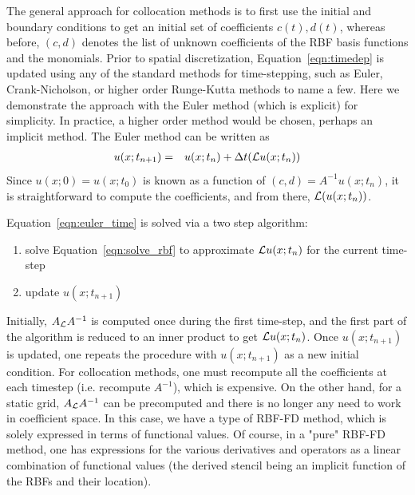 \documentclass{report}
\begin{document}
{The general approach for collocation methods is to first use the initial and boundary conditions to get an initial set of 
coefficients $c(t), d(t)$, whereas before, $(c,d)$ denotes the list of unknown coefficients of the RBF basis functions and the monomials. 
Prior to spatial discretization, Equation~\ref{eqn:timedep} is updated using any of the standard methods for time-stepping, such as Euler, Crank-Nicholson, or higher order Runge-Kutta methods to name a few. Here we demonstrate the approach with the Euler method (which is explicit) for simplicity. In practice, a higher order method would be chosen, perhaps an implicit method. 
The Euler method can be written as
\begin{eqnarray}
u(x; t_{n+1}) &=& u(x; t_{n}) + \Delta t (\diffop{u(x;t_n)}) %
 \label{eqn:euler_time}
\end{eqnarray}
Since $u(x;0)=u(x;t_0)$ is known as a function of $(c,d)=A^{-1} u(x;t_n)$, it is straightforward to compute the coefficients, and from there, $\mathcal{L}(u(x;t_n))$. 

Equation~\ref{eqn:euler_time} is solved via a two step algorithm: 
\begin{enumerate}
	\item solve Equation~\ref{eqn:solve_rbf} to approximate $\mathcal{L}u(x;t_n)$ for the current time-step
	\item update $u(x;t_{n+1})$
\end{enumerate}
Initially, $A_{\mathcal{L}} A^{-1}$ is computed once during the first time-step, and the first part of the algorithm is reduced to an inner product to get $\mathcal{L}u(x;t_n)$. Once $u(x;t_{n+1})$ is updated, one repeats the procedure with $u(x;t_{n+1})$ as a new initial condition. For collocation methods, one must recompute all the coefficients at each timestep (i.e. recompute $A^{-1}$), which is expensive. On the other hand, for a static grid,  $A_{\mathcal{L}} A^{-1}$ can be precomputed and there is no longer any need to work in coefficient space. In this case, we have a type of RBF-FD method, which is solely expressed in terms of functional values. Of course, in a "pure" RBF-FD method, one has expressions for the various derivatives and operators as a linear combination of functional values (the derived stencil being an implicit function of the RBFs and their location). 

}
\end{document}
